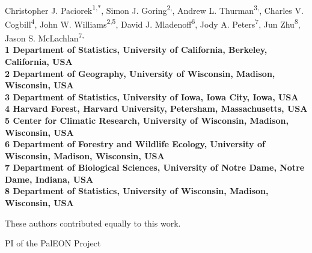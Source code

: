 \documentclass[10pt,letterpaper]{article}
\date{}
\begin{document}
\vspace*{0.35in}

\begin{flushleft}
{\Large
\textbf{}
}
\newline
\\
Christopher J. Paciorek\textsuperscript{1,*},
Simon J. Goring\textsuperscript{2,\Yinyang},
Andrew L. Thurman\textsuperscript{3,\Yinyang},
Charles V. Cogbill\textsuperscript{4},
John W. Williams\textsuperscript{2,5},
David J. Mladenoff\textsuperscript{6},
Jody A. Peters\textsuperscript{7},
Jun Zhu\textsuperscript{8},
Jason S. McLachlan\textsuperscript{7,\ddag}
\\
\bigskip
\bf{1} Department of Statistics, University of California, Berkeley, California,
USA
\\
\bf{2} Department of Geography, University of Wisconsin, Madison, Wisconsin,
USA
\\
\bf{3} Department of Statistics, University of Iowa, Iowa City, Iowa, USA
\\
\bf{4} Harvard Forest, Harvard University, Petersham, Massachusetts, USA
\\
\bf{5} Center for Climatic Research, University of Wisconsin, Madison,
Wisconsin, USA
\\
\bf{6} Department of Forestry and Wildlife Ecology, University of Wisconsin,
Madison, Wisconsin, USA
\\
\bf{7} Department of Biological Sciences, University of Notre Dame, Notre
Dame, Indiana, USA
\\
\bf{8} Department of Statistics, University of Wisconsin, Madison, Wisconsin,
USA
\\
\bigskip

% 
%
\Yinyang These authors contributed equally to this work.

 \ddag PI of the PalEON Project


\end{flushleft}
\end{document}
